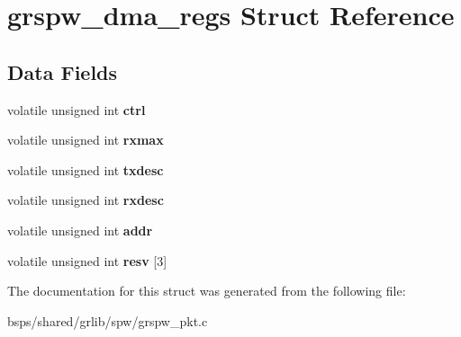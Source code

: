 \hypertarget{structgrspw__dma__regs}{}\section{grspw\+\_\+dma\+\_\+regs Struct Reference}
\label{structgrspw__dma__regs}
\subsection*{Data Fields}
\begin{DoxyCompactItemize}
\item 
\mbox{\label{structgrspw__dma__regs_a0321eda2b6d0da18917da90e3a7c2f48}} 
volatile unsigned int {\bfseries ctrl}
\item 
\mbox{\label{structgrspw__dma__regs_a6993e60e6c0fe1b376b346ec7c4105be}} 
volatile unsigned int {\bfseries rxmax}
\item 
\mbox{\label{structgrspw__dma__regs_a0bb4aa6006941b3c857eef9ceab13b06}} 
volatile unsigned int {\bfseries txdesc}
\item 
\mbox{\label{structgrspw__dma__regs_a42f91dd6e5290f8d71fb14f7eafb9e1e}} 
volatile unsigned int {\bfseries rxdesc}
\item 
\mbox{\label{structgrspw__dma__regs_a6caabf06f5006784369609429216dbcf}} 
volatile unsigned int {\bfseries addr}
\item 
\mbox{\label{structgrspw__dma__regs_a0ad9cd3ade59254f43b368dd95e51aad}} 
volatile unsigned int {\bfseries resv} \mbox{[}3\mbox{]}
\end{DoxyCompactItemize}


The documentation for this struct was generated from the following file\+:\begin{DoxyCompactItemize}
\item 
bsps/shared/grlib/spw/grspw\+\_\+pkt.\+c\end{DoxyCompactItemize}

